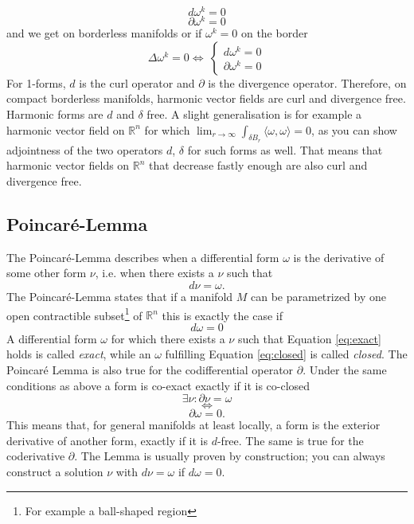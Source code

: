 \[d\omega^k = 0\]
\[\partial\omega^k = 0\]
and we get on borderless manifolds or if $\omega^k = 0$ on the border
\[\Delta \omega^k = 0 \Leftrightarrow \: \left\{\begin{matrix}
d\omega^k = 0\\
\partial \omega^k = 0
\end{matrix}\right.\]
For 1-forms, $d$ is the curl operator and $\partial$ is the divergence operator. Therefore, on compact borderless manifolds, harmonic vector fields are curl and divergence free. Harmonic forms are $d$ and $\delta$ free. A slight generalisation is for example a harmonic vector field on $\mathbb R^n$ for which $\lim_{r\to \infty} \int_{\delta B_r} \langle \omega , \omega \rangle  = 0$, as you can show adjointness of the two operators $d$, $\delta$ for such forms as well. That means that harmonic vector fields on $\mathbb R^n$ that decrease fastly enough are also curl and divergence free. 

\subsection{Poincar\'e-Lemma}
The Poincar\'e-Lemma describes when a differential form $\omega$ is the derivative of some other form $\nu$, i.e. when there exists a $\nu$ such that
\begin{equation} d\nu = \omega .\label{eq:exact}\end{equation}
The Poincar\'e-Lemma states that if a manifold $M$ can be parametrized by one open contractible subset\footnote{For example a ball-shaped region} of $\mathbb R^n$ this is exactly the case if
\begin{equation} d\omega = 0 \label{eq:closed}\end{equation}
A differential form $\omega$ for which there exists a $\nu$ such that Equation \ref{eq:exact} holds is called \emph{exact}, while an $\omega$ fulfilling Equation \ref{eq:closed} is called \emph{closed}. The Poincar\'e Lemma is also true for the codifferential operator $\partial$. Under the same conditions as above a form is co-exact exactly if it is co-closed
\[\exists \nu : \partial \nu = \omega\] \[\Leftrightarrow\]\[ \partial \omega = 0.\]
This means that, for general manifolds at least locally, a form is the exterior derivative of another form, exactly if it is $d$-free. The same is true for the coderivative $\partial$. The Lemma is usually proven by construction; you can always construct a solution $\nu$ with $d\nu = \omega$ if $d\omega = 0$. 

